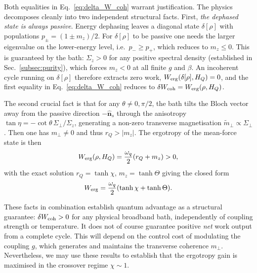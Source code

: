 Both equalities in Eq.~\eqref{eq:delta_W_coh} warrant justification.
The physics decomposes cleanly into two independent structural facts. First, \emph{the dephased state is always passive}. Energy dephasing leaves a diagonal state $\delta[\rho]$ with populations
$p_\pm = (1\pm m_z)/2$.  For $\delta[\rho]$ to be passive one needs the
larger eigenvalue on the lower-energy level, i.e.\ $p_- \geq p_+$, which
reduces to $m_z \leq 0$.  This is guaranteed by the bath: $\Sigma_z > 0$
for any positive spectral density (established in Sec.~\ref{subsec:purity}),
which forces $m_z < 0$ at all finite $g$ and $\beta$.  An incoherent cycle
running on $\delta[\rho]$ therefore extracts zero work,
$W_{\rm erg}(\delta[\rho],H_Q)=0$, and the first equality in
Eq.~\eqref{eq:delta_W_coh} reduces to
$\delta W_{\rm coh} = W_{\rm erg}(\rho,H_Q)$.

The second crucial fact is that for any $\theta \neq 0, \pi/2$, the bath tilts the Bloch vector away from the passive direction $-\hat{\mathbf{n}}_s$ through the anisotropy
$\tan\eta=-\cot\theta\,\Sigma_\perp/\Sigma_z$,
generating a non-zero transverse
magnetisation $\tilde{m}_\perp\propto\Sigma_\perp$.
Then one has \(m_\perp\neq 0\) and thus
\(r_Q > |m_z|\). The ergotropy of the mean-force state is then
\begin{equation}
  W_{\rm erg}(\rho,H_Q) = \frac{\omega_q}{2}(r_Q + m_z) > 0,
  \label{eq:ergotropy_qubit}
\end{equation}
with the exact solution \(r_Q=\tanh\chi\), \(m_z=\tanh\Theta\) giving the
closed form
\begin{equation}
  W_{\rm erg} = \frac{\omega_q}{2}(\tanh\chi + \tanh\Theta).
  \label{eq:ergotropy_exact}
\end{equation}

These facts in combination establish quantum advantage as a structural guarantee:
\(\delta W_{\rm coh}>0\) for any physical broadband bath, independently of
coupling strength or temperature. It does
not of course guarantee positive \emph{net} work output from a complete cycle. This will depend on the control cost
of modulating the coupling $g$, which generates and maintains the
transverse coherence $m_\perp$. Nevertheless, we may use these results to establish that the ergotropy gain is maximised in the crossover regime $\chi \sim 1$. 

